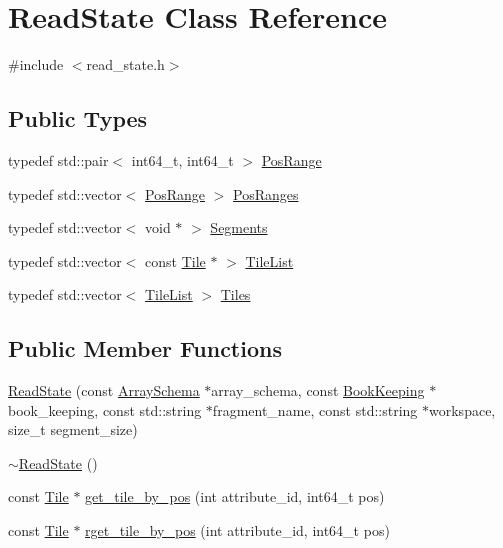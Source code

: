 \hypertarget{classReadState}{}\section{Read\+State Class Reference}
\label{classReadState}


{\ttfamily \#include $<$read\+\_\+state.\+h$>$}

\subsection*{Public Types}
\begin{DoxyCompactItemize}
\item 
typedef std\+::pair$<$ int64\+\_\+t, int64\+\_\+t $>$ \hyperlink{classReadState_a63b506f0fede5c4a26c6bf4d744ce0bc}{Pos\+Range}
\item 
typedef std\+::vector$<$ \hyperlink{classReadState_a63b506f0fede5c4a26c6bf4d744ce0bc}{Pos\+Range} $>$ \hyperlink{classReadState_a83c1f880e2c8bf77f3aa57262bb31043}{Pos\+Ranges}
\item 
typedef std\+::vector$<$ void $\ast$ $>$ \hyperlink{classReadState_a0c5d7b8fb9e545e2f1801f9acdedd45e}{Segments}
\item 
typedef std\+::vector$<$ const \hyperlink{classTile}{Tile} $\ast$ $>$ \hyperlink{classReadState_aa1737c390080a8ba377a4ed43f19a569}{Tile\+List}
\item 
typedef std\+::vector$<$ \hyperlink{classReadState_aa1737c390080a8ba377a4ed43f19a569}{Tile\+List} $>$ \hyperlink{classReadState_a622db54fa71351c2c36d4a1dcd872225}{Tiles}
\end{DoxyCompactItemize}
\subsection*{Public Member Functions}
\begin{DoxyCompactItemize}
\item 
\hyperlink{classReadState_a147f37121a3d883d845ac709b103b3ab}{Read\+State} (const \hyperlink{classArraySchema}{Array\+Schema} $\ast$array\+\_\+schema, const \hyperlink{classBookKeeping}{Book\+Keeping} $\ast$book\+\_\+keeping, const std\+::string $\ast$fragment\+\_\+name, const std\+::string $\ast$workspace, size\+\_\+t segment\+\_\+size)
\item 
\hyperlink{classReadState_add7795984eb06c07c7c0c93e3542c470}{$\sim$\+Read\+State} ()
\item 
const \hyperlink{classTile}{Tile} $\ast$ \hyperlink{classReadState_a28225496c488f2410a668e0b5aeba95c}{get\+\_\+tile\+\_\+by\+\_\+pos} (int attribute\+\_\+id, int64\+\_\+t pos)
\item 
const \hyperlink{classTile}{Tile} $\ast$ \hyperlink{classReadState_a7ef29c1850c265d9eaf277900e81b6b3}{rget\+\_\+tile\+\_\+by\+\_\+pos} (int attribute\+\_\+id, int64\+\_\+t pos)
\end{DoxyCompactItemize}
